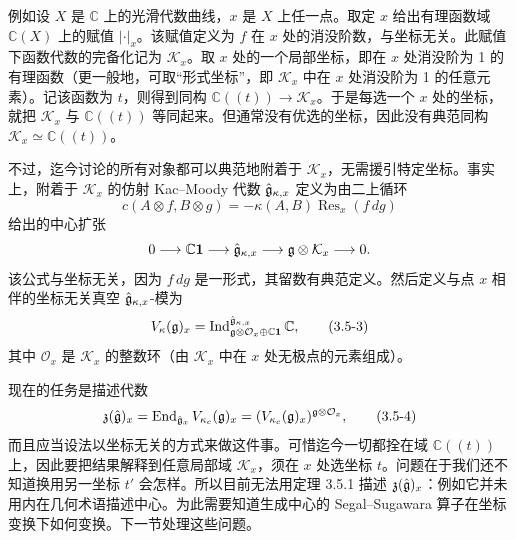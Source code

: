 例如设 $X$ 是 $\mathbb{C}$ 上的光滑代数曲线，$x$ 是 $X$ 上任一点。取定 $x$ 给出有理函数域 $\mathbb{C}(X)$ 上的赋值 $|\cdot|_x$。该赋值定义为 $f$ 在 $x$ 处的消没阶数，与坐标无关。此赋值下函数代数的完备化记为 $\mathcal{K}_x$。取 $x$ 处的一个局部坐标，即在 $x$ 处消没阶为 1 的有理函数（更一般地，可取“形式坐标”，即 $\mathcal{K}_x$ 中在 $x$ 处消没阶为 1 的任意元素）。记该函数为 $t$，则得到同构 $\mathbb{C}((t))\to\mathcal{K}_x$。于是每选一个 $x$ 处的坐标，就把 $\mathcal{K}_x$ 与 $\mathbb{C}((t))$ 等同起来。但通常没有优选的坐标，因此没有典范同构 $\mathcal{K}_x\simeq\mathbb{C}((t))$。

不过，迄今讨论的所有对象都可以典范地附着于 $\mathcal{K}_x$，无需援引特定坐标。事实上，附着于 $\mathcal{K}_x$ 的仿射 Kac–Moody 代数 $\hat{\mathfrak{g}}_{\kappa,x}$ 定义为由二上循环
\[
    c(A\otimes f,B\otimes g)=-\kappa(A,B)\operatorname{Res}_x(f\,dg)
\]
给出的中心扩张
\[
    0\longrightarrow\mathbb{C}\mathbf{1}\longrightarrow\hat{\mathfrak{g}}_{\kappa,x}\longrightarrow\mathfrak{g}\otimes\mathcal{K}_x\longrightarrow 0 .
\]
该公式与坐标无关，因为 $f\,dg$ 是一形式，其留数有典范定义。然后定义与点 $x$ 相伴的坐标无关真空 $\hat{\mathfrak{g}}_{\kappa,x}$-模为
\begin{equation}
    V_\kappa(\mathfrak{g})_x=\operatorname{Ind}^{\hat{\mathfrak{g}}_{\kappa,x}}_{\mathfrak{g}\otimes\mathcal{O}_x\oplus\mathbb{C}\mathbf{1}}\mathbb{C},
    \tag{3.5-3}
\end{equation}
其中 $\mathcal{O}_x$ 是 $\mathcal{K}_x$ 的整数环（由 $\mathcal{K}_x$ 中在 $x$ 处无极点的元素组成）。

现在的任务是描述代数
\begin{equation}
    \mathfrak{z}(\hat{\mathfrak{g}})_x=\operatorname{End}_{\hat{\mathfrak{g}}_x}V_{\kappa_c}(\mathfrak{g})_x
    =(V_{\kappa_c}(\mathfrak{g})_x)^{\mathfrak{g}\otimes\mathcal{O}_x},
    \tag{3.5-4}
\end{equation}
而且应当设法以坐标无关的方式来做这件事。可惜迄今一切都拴在域 $\mathbb{C}((t))$ 上，因此要把结果解释到任意局部域 $\mathcal{K}_x$，须在 $x$ 处选坐标 $t$。问题在于我们还不知道换用另一坐标 $t'$ 会怎样。所以目前无法用定理 3.5.1 描述 $\mathfrak{z}(\hat{\mathfrak{g}})_x$：例如它并未用内在几何术语描述中心。为此需要知道生成中心的 Segal–Sugawara 算子在坐标变换下如何变换。下一节处理这些问题。


